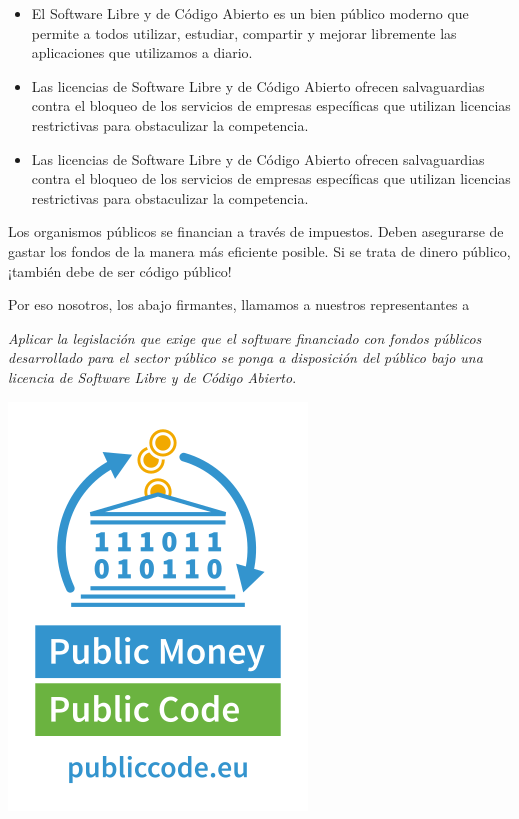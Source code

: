 \documentclass[10pt,foldmark,tumble]{leaflet}
\begin{document}
\begin{itemize}
    \item El Software Libre y de Código Abierto es un bien público moderno que permite a todos utilizar, estudiar, compartir y mejorar libremente las aplicaciones que utilizamos a diario.
    \item Las licencias de Software Libre y de Código Abierto ofrecen salvaguardias contra el bloqueo de los servicios de empresas específicas que utilizan licencias restrictivas para obstaculizar la competencia.
    \item Las licencias de Software Libre y de Código Abierto ofrecen salvaguardias contra el bloqueo de los servicios de empresas específicas que utilizan licencias restrictivas para obstaculizar la competencia.
\end{itemize}


    Los organismos públicos se financian a través de impuestos. Deben asegurarse de gastar los fondos de la manera más eficiente posible. Si se trata de dinero público, ¡también debe de ser código público!

    Por eso nosotros, los abajo firmantes, llamamos a nuestros representantes a

    \emph{Aplicar la legislación que exige que el software financiado con fondos públicos desarrollado para el sector público se ponga a disposición del público bajo una licencia de Software Libre y de Código Abierto}.


\newpage

\vspace{15em}


\includegraphics[scale=1.6]{pmpc.png} 
\end{document}
